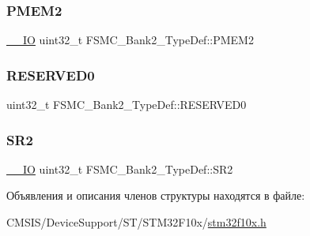 \subsubsection{\texorpdfstring{PMEM2}{PMEM2}}
{\footnotesize\ttfamily \mbox{\hyperlink{group___c_m_s_i_s___c_m3__core__definitions_gaec43007d9998a0a0e01faede4133d6be}{\+\_\+\+\_\+\+IO}} uint32\+\_\+t F\+S\+M\+C\+\_\+\+Bank2\+\_\+\+Type\+Def\+::\+P\+M\+E\+M2}

\mbox{\label{struct_f_s_m_c___bank2___type_def_ac0433330a92f2bd04812384f63bb4a52}} 
\subsubsection{\texorpdfstring{RESERVED0}{RESERVED0}}
{\footnotesize\ttfamily uint32\+\_\+t F\+S\+M\+C\+\_\+\+Bank2\+\_\+\+Type\+Def\+::\+R\+E\+S\+E\+R\+V\+E\+D0}

\mbox{\label{struct_f_s_m_c___bank2___type_def_a38ad7403e05c899dc266cf47f932cc8f}} 
\subsubsection{\texorpdfstring{SR2}{SR2}}
{\footnotesize\ttfamily \mbox{\hyperlink{group___c_m_s_i_s___c_m3__core__definitions_gaec43007d9998a0a0e01faede4133d6be}{\+\_\+\+\_\+\+IO}} uint32\+\_\+t F\+S\+M\+C\+\_\+\+Bank2\+\_\+\+Type\+Def\+::\+S\+R2}



Объявления и описания членов структуры находятся в файле\+:\begin{DoxyCompactItemize}
\item 
C\+M\+S\+I\+S/\+Device\+Support/\+S\+T/\+S\+T\+M32\+F10x/\mbox{\hyperlink{stm32f10x_8h}{stm32f10x.\+h}}\end{DoxyCompactItemize}
